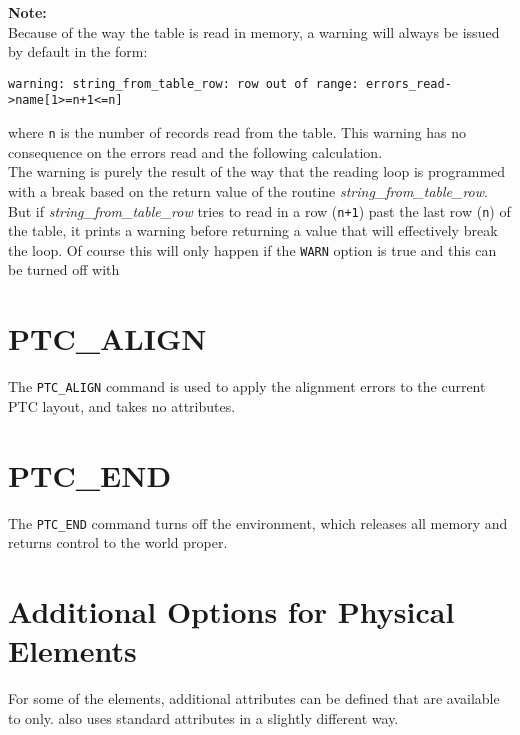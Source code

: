 \textbf{Note:}\\
Because of the way the table is read in memory, a warning will always be
issued by default in the form:
{\small
\begin{verbatim}
warning: string_from_table_row: row out of range: errors_read->name[1>=n+1<=n]
\end{verbatim}
}
where \texttt{n} is  the number of records read from the table.
This warning has no consequence on the errors read and the following
calculation. \\
The warning is purely the result of the way that the reading loop is
programmed with a break based on the return value of the routine
\textsl{string\_from\_table\_row}.
But if \textsl{string\_from\_table\_row} tries to read in a row (\texttt{n+1})
past the last row (\texttt{n}) of the table, it prints a warning before
returning a value that will effectively break the loop. Of course this
will only happen if the \texttt{WARN} option is true and this can be turned
off with 



\section{PTC\_ALIGN}
\label{sec:ptc-align}

The \texttt{PTC\_ALIGN} command is used to apply the \madx alignment
errors to the current PTC layout, and takes no attributes.



\section{PTC\_END}
\label{sec:ptc-end}

The \texttt{PTC\_END} command turns off the \ptc environment,
which releases all memory and returns control to the \madx world proper.



\section{Additional Options for Physical Elements}
\label{sec:add-option-PTC}

For some of the \madx elements, additional attributes can be defined
that are available to \ptc only. \ptc also uses standard \madx
attributes in a slightly different way.


